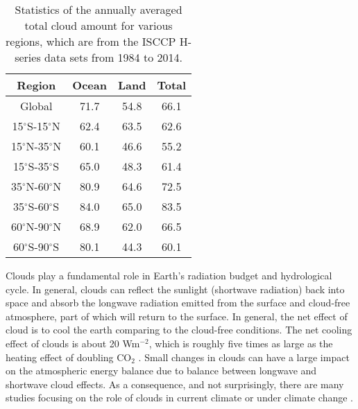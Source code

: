 \begin{table}[htp]
\centering
\caption{Statistics of the annually averaged total cloud amount for various regions, which are from the ISCCP H-series data sets \citep{Young2018} from 1984 to 2014.}
\vspace{0.5em}
\begin{tabular}{cccc}
	\toprule
	Region & Ocean & Land &  Total\\
	\midrule
	Global & 71.7 & 54.8 & 66.1 \\
	15$^\circ$S-15$^\circ$N&  62.4&  63.5& 62.6 \\
	15$^\circ$N-35$^\circ$N&  60.1&  46.6& 55.2\\
	15$^\circ$S-35$^\circ$S&  65.0&  48.3& 61.4\\
	35$^\circ$N-60$^\circ$N&  80.9&  64.6& 72.5 \\
	35$^\circ$S-60$^\circ$S&  84.0&  65.0& 83.5 \\
	60$^\circ$N-90$^\circ$N&  68.9&  62.0& 66.5\\
	60$^\circ$S-90$^\circ$S&  80.1&  44.3& 60.1 \\
	\bottomrule
\end{tabular}
\label{tab:statistics_cld_amt}
\end{table}

Clouds play a fundamental role in Earth's radiation budget and hydrological cycle. In general, clouds can reflect the sunlight (shortwave radiation) back into space and absorb the longwave radiation emitted from the surface and cloud-free atmosphere, part of which will return to the surface. In general, the net effect of cloud is to cool the earth comparing to the cloud-free conditions. The net cooling effect of clouds is about 20 Wm$^{-2}$, which is roughly five times as large as the heating effect of doubling CO$_2$ \citep{Zelinka2017,Wild2019}. Small changes in clouds can have a large impact on the atmospheric energy balance due to balance between longwave and shortwave cloud effects. As a consequence, and not surprisingly, there are many studies focusing on the role of clouds in current climate or under climate change \citep[e.g.,][]{Cess1990intercomparison,Zelinka2017}.


